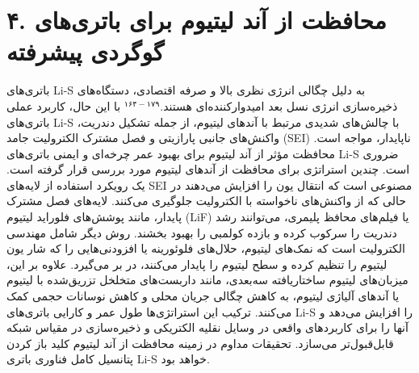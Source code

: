 \documentclass[12pt,a4paper,twocolumn]{article} %
\newcommand{\persian}[1]{\textfarsi{#1}}
\newcommand{\english}[1]{\textenglish{#1}}
\begin{document}
\section*{\persian{۴. محافظت از آند لیتیوم برای باتری‌های گوگردی پیشرفته}}
\persian{
باتری‌های \english{Li-S} به دلیل چگالی انرژی نظری بالا و صرفه اقتصادی، دستگاه‌های ذخیره‌سازی انرژی نسل بعد امیدوارکننده‌ای هستند.$^{۱۶۴-۱۷۹}$ با این حال، کاربرد عملی باتری‌های \english{Li-S} با چالش‌های شدیدی مرتبط با آندهای لیتیوم، از جمله تشکیل دندریت، واکنش‌های جانبی پارازیتی و فصل مشترک الکترولیت جامد (\english{SEI}) ناپایدار، مواجه است. محافظت مؤثر از آند لیتیوم برای بهبود عمر چرخه‌ای و ایمنی باتری‌های \english{Li-S} ضروری است.
}
\persian{
چندین استراتژی برای محافظت از آندهای لیتیوم مورد بررسی قرار گرفته است. یک رویکرد استفاده از لایه‌های \english{SEI} مصنوعی است که انتقال یون را افزایش می‌دهند در حالی که از واکنش‌های ناخواسته با الکترولیت جلوگیری می‌کنند. لایه‌های فصل مشترک پایدار، مانند پوشش‌های فلوراید لیتیوم (\english{LiF}) یا فیلم‌های محافظ پلیمری، می‌توانند رشد دندریت را سرکوب کرده و بازده کولمبی را بهبود بخشند. روش دیگر شامل مهندسی الکترولیت است که نمک‌های لیتیوم، حلال‌های فلوئورینه یا افزودنی‌هایی را که شار یون لیتیوم را تنظیم کرده و سطح لیتیوم را پایدار می‌کنند، در بر می‌گیرد. علاوه بر این، میزبان‌های لیتیوم ساختاریافته سه‌بعدی، مانند داربست‌های متخلخل تزریق‌شده با لیتیوم یا آندهای آلیاژی لیتیوم، به کاهش چگالی جریان محلی و کاهش نوسانات حجمی کمک می‌کنند. ترکیب این استراتژی‌ها طول عمر و کارایی باتری‌های \english{Li-S} را افزایش می‌دهد و آنها را برای کاربردهای واقعی در وسایل نقلیه الکتریکی و ذخیره‌سازی در مقیاس شبکه قابل‌قبول‌تر می‌سازد. تحقیقات مداوم در زمینه محافظت از آند لیتیوم کلید باز کردن پتانسیل کامل فناوری باتری \english{Li-S} خواهد بود.
}
\end{document}
